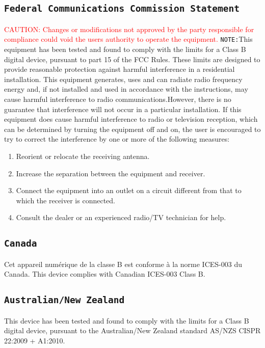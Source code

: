 \subsection{\texttt{Federal Communications Commission Statement}}
\textcolor{red}{CAUTION: Changes or modifications not approved by the party responsible for compliance could void the users authority to operate the equipment.}
\texttt{NOTE:}This equipment has been tested and found to comply with the limits for a Class B digital device, pursuant to part 15 of the FCC Rules. These limits are designed to provide reasonable protection against harmful interference in a residential installation. This equipment generates, uses and can radiate radio frequency energy and, if not installed and used in accordance with the instructions, may cause harmful interference to radio communications.However, there is no guarantee that interference will not occur in a particular installation. If this equipment does cause harmful interference to radio or television reception, which can be determined by turning the equipment off and on, the user is encouraged to try to correct the interference by one or more of the following measures:
\begin{enumerate}
\item Reorient or relocate the receiving antenna.
\item Increase the separation between the equipment and receiver.
\item Connect the equipment into an outlet on a circuit different from that to which the receiver
is connected.
\item Consult the dealer or an experienced radio/TV technician for help.
\end{enumerate}

\subsection{\texttt{Canada}}
Cet appareil numérique de la classe B est conforme à la norme ICES-003 du Canada.
This device complies with Canadian ICES-003 Class B.

\subsection{\texttt{Australian/New Zealand}}
This device has been tested and found to comply with the limits for a Class B digital device, pursuant to the Australian/New Zealand standard AS/NZS CISPR 22:2009 + A1:2010.

